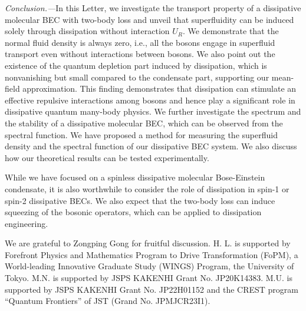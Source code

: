 \documentclass[aps,prl,twocolumn,superscriptaddress,]{revtex4-1}
\begin{document}
\emph{Conclusion.---}In this Letter, we investigate the
transport property of a dissipative molecular BEC with two-body loss and
unveil that superfluidity can be induced solely through dissipation
without interaction $U_{R}$. 
We demonstrate that the normal fluid density is always zero, i.e., all the bosons engage in superfluid transport even without interactions between bosons. We also point out the existence of the quantum depletion part induced by dissipation, which is nonvanishing but small compared to the condensate part, supporting our mean-field approximation. This finding demonstrates that dissipation can stimulate an effective repulsive interactions among
bosons and hence play a significant role in dissipative
quantum many-body physics. We further investigate the spectrum and the stability of a dissipative molecular BEC, which can be observed from the spectral function. %
We have proposed
a method for measuring the superfluid density and the spectral function
of our dissipative BEC system. We also discuss how our theoretical results can be tested experimentally.

While we have focused on a spinless dissipative molecular Bose-Einstein condensate, it is also worthwhile to consider the role of dissipation in spin-1 or spin-2 dissipative BECs. We also expect that the two-body loss can induce squeezing of the bosonic operators, which can be applied to dissipation engineering.

We are grateful to Zongping Gong for fruitful discussion. H. L. is
supported by Forefront Physics and Mathematics Program to Drive Transformation
(FoPM), a World-leading Innovative Graduate Study (WINGS) Program,
the University of Tokyo. M.N. is supported by JSPS KAKENHI Grant No.
JP20K14383. M.U. is supported by JSPS KAKENHI Grant No. JP22H01152
and the CREST program “Quantum Frontiers” of JST (Grand No. JPMJCR23I1).



\end{document}
